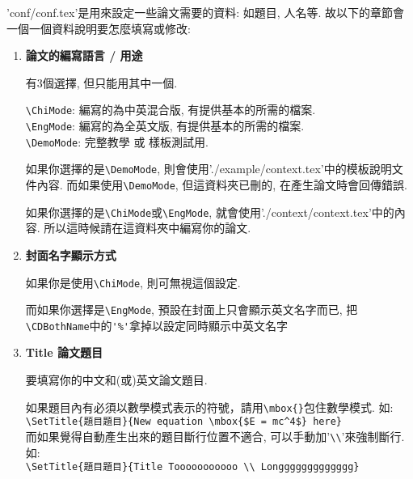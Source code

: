 

'conf/conf.tex'是用來設定一些論文需要的資料: 如題目, 人名等. 故以下的章節會一個一個資料說明要怎麼填寫或修改:

\begin{enumerate}
  \item
  {
    \textbf{論文的編寫語言 / 用途}

    有3個選擇, 但只能用其中一個.

    \verb|\ChiMode|:  編寫的為中英混合版, 有提供基本的所需的檔案.\\
    \verb|\EngMode|:  編寫的為全英文版, 有提供基本的所需的檔案.\\
    \verb|\DemoMode|: 完整教學 或 樣板測試用.

    如果你選擇的是\verb|\DemoMode|, 則會使用'./example/context.tex'中的模板說明文件內容. 而如果使用\verb|\DemoMode|, 但這資料夾已刪的, 在產生論文時會回傳錯誤.

    如果你選擇的是\verb|\ChiMode|或\verb|\EngMode|, 就會使用'./context/context.tex'中的內容. 所以這時候請在這資料夾中編寫你的論文.
  } %

  \item
  {
    \textbf{封面名字顯示方式}

    如果你是使用\verb|\ChiMode|, 則可無視這個設定.

    而如果你選擇是\verb|\EngMode|, 預設在封面上只會顯示英文名字而已, 把\verb|\CDBothName|中的\verb|'%'|拿掉以設定同時顯示中英文名字

  } %

  \item
  {
    \textbf{Title 論文題目}

    要填寫你的中文和(或)英文論文題目.

    如果題目內有必須以數學模式表示的符號，請用\verb|\mbox{}|包住數學模式. 如:\\
    \verb|\SetTitle{題目題目}{New equation \mbox{$E = mc^4$} here}|\\

    而如果覺得自動產生出來的題目斷行位置不適合, 可以手動加'\verb|\\|'來強制斷行. 如:\\
    \verb|\SetTitle{題目題目}{Title Tooooooooooo \\ Longgggggggggggg}|\\

}
\end{enumerate}
